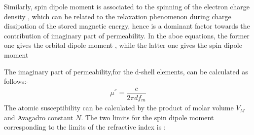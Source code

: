 \documentclass[journal]{IEEEtran}
\begin{document}
\begin{multicols}{2}
Similarly, spin dipole moment is associated to the spinning of the electron charge density , which can be related to the relaxation phenomenon during charge dissipation of the stored magnetic energy, hence is a dominant factor towards the contribution of imaginary part of permeability. In the aboe equations, the former one gives the orbital dipole moment , while the latter one gives the spin dipole moment

The imaginary part of permeability,for the d-shell elements, can be calculated as follows:-
\begin{align}
\mu^{''} = \dfrac{c}{2 \pi d f_m}
\end{align}
The atomic susceptibility can be calculated by the product of molar volume $ V_M $ and Avagadro constant $ N $. The two limits for the spin dipole moment corresponding to the limits of the refractive index is :



\end{multicols}
\end{document}
